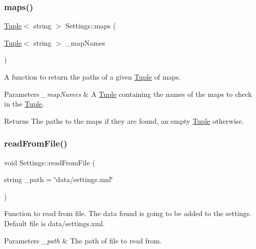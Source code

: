 \subsubsection{\texorpdfstring{maps()}{maps()}\hspace{0.1cm}{\footnotesize\ttfamily [4/4]}}
{\footnotesize\ttfamily \mbox{\hyperlink{class_tuple}{Tuple}}$<$ string $>$ Settings\+::maps (\begin{DoxyParamCaption}\item[{\mbox{\hyperlink{class_tuple}{Tuple}}$<$ string $>$}]{\+\_\+map\+Names }\end{DoxyParamCaption})}



A function to return the paths of a given \mbox{\hyperlink{class_tuple}{Tuple}} of maps. 


\begin{DoxyParams}{Parameters}
{\em \+\_\+map\+Names} & A \mbox{\hyperlink{class_tuple}{Tuple}} containing the names of the maps to check in the \mbox{\hyperlink{class_tuple}{Tuple}}. \\
\hline
\end{DoxyParams}
\begin{DoxyReturn}{Returns}
The paths to the maps if they are found, an empty \mbox{\hyperlink{class_tuple}{Tuple}} otherwise. 
\end{DoxyReturn}
\mbox{\label{class_settings_a016ac9600bf42a2814847f14e5a3d58f}} 
\subsubsection{\texorpdfstring{readFromFile()}{readFromFile()}}
{\footnotesize\ttfamily void Settings\+::read\+From\+File (\begin{DoxyParamCaption}\item[{string}]{\+\_\+path = {\ttfamily \char`\"{}data/settings.xml\char`\"{}} }\end{DoxyParamCaption})}



Function to read from file. The data found is going to be added to the settings. Default file is data/settings.\+xml. 


\begin{DoxyParams}{Parameters}
{\em \+\_\+path} & The path of file to read from. \\
\hline
\end{DoxyParams}
\mbox{\label{class_settings_a6e40d9eca9f6794dee65e519ea73bb24}} 
